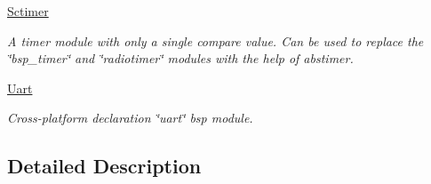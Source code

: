 \begin{DoxyCompactItemize}
\hyperlink{group__sctimer}{Sctimer}
\begin{DoxyCompactList}\small\item\em A timer module with only a single compare value. Can be used to replace the \char`\"{}bsp\+\_\+timer\char`\"{} and \char`\"{}radiotimer\char`\"{} modules with the help of abstimer. \end{DoxyCompactList}\item 
\hyperlink{group__uart}{Uart}
\begin{DoxyCompactList}\small\item\em Cross-\/platform declaration \char`\"{}uart\char`\"{} bsp module. \end{DoxyCompactList}\end{DoxyCompactItemize}


\subsection{Detailed Description}

